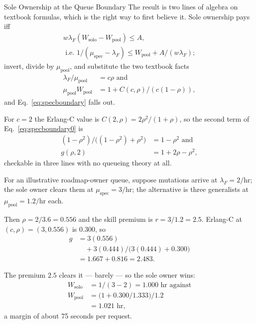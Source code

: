 \documentclass[11pt,a4paper]{article}
\theoremstyle{definition}
\theoremstyle{plain}
\begin{document}
\begin{pdexample}{Sole Ownership at the Queue Boundary}
\setlength{\parskip}{4pt plus 1pt}
\label{ex:queue-boundary}
The result is two lines of algebra on textbook
formulas, which is the right way to first believe it. Sole ownership pays iff
\[
\begin{gathered}
w\lambda_F(W_{\mathrm{solo}}-W_{\mathrm{pool}}) \le A,\\
\text{ i.e.\ }1/(\mu_{\mathrm{spec}}-\lambda_F)
 \le W_{\mathrm{pool}} + A/(w\lambda_F);
\end{gathered}
\]
invert,
divide by $\mu_{\mathrm{pool}}$, and substitute the two textbook facts
\[
\begin{aligned}
\lambda_F/\mu_{\mathrm{pool}} &= c\rho \text{ and}\\
\mu_{\mathrm{pool}}W_{\mathrm{pool}} &= 1 + C(c,\rho)/(c(1-\rho)),
\end{aligned}
\]
and
Eq.~\ref{eq:specboundary} falls out.

For $c=2$ the Erlang-C value is
$C(2,\rho)=2\rho^2/(1+\rho)$, so
the second term of Eq.~\ref{eq:specboundary0} is
\[
\begin{aligned}
(1-\rho^2)/\bigl((1-\rho^2)+\rho^2\bigr) &= 1-\rho^2 \text{ and}\\
g(\rho,2)&=1+2\rho-\rho^2,
\end{aligned}
\]
checkable in three lines with no queueing theory at all.

For an illustrative roadmap-owner queue, suppose mutations arrive at
$\lambda_F = 2/\text{hr}$; the sole owner clears them at
$\mu_{\mathrm{spec}} = 3/\text{hr}$; the alternative is three generalists at
$\mu_{\mathrm{pool}} = 1.2/\text{hr}$ each.

Then $\rho = 2/3.6 = 0.556$ and the
skill premium is $r = 3/1.2 = 2.5$. Erlang-C at $(c,\rho)=(3,0.556)$ is $0.300$, so
\[
\begin{aligned}
g &= 3(0.556)\\
&\quad{}+ 3(0.444)/\bigl(3(0.444)+0.300\bigr)\\
&= 1.667 + 0.816 = 2.483.
\end{aligned}
\]

The
premium $2.5$ clears it --- barely --- so the sole owner wins:
\[
\begin{aligned}
W_{\mathrm{solo}} &= 1/(3-2) = 1.000 \text{ hr against}\\
W_{\mathrm{pool}} &= \bigl(1+0.300/1.333\bigr)/1.2\\
&= 1.021 \text{ hr},
\end{aligned}
\]
a margin of about
75 seconds per request.


\end{pdexample}
\end{document}
